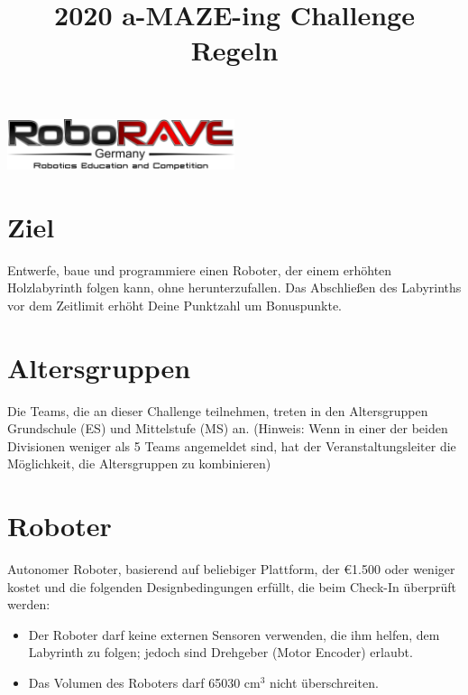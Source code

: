 \documentclass[a4paper,12pt]{article}
\title{2020 a-MAZE-ing Challenge Regeln}
\makeatletter
\let\inserttitle\@title
\makeatother
\begin{document}
\begin{center}
	\includegraphics[width=0.5\textwidth]{logo.png}

	\huge                      %
	\bfseries                   %
	\inserttitle
\end{center}

\section{Ziel}
Entwerfe, baue und programmiere einen Roboter, der einem erhöhten Holzlabyrinth
folgen kann, ohne herunterzufallen. Das Abschließen des Labyrinths vor dem
Zeitlimit erhöht Deine Punktzahl um Bonuspunkte.

\section{Altersgruppen}
Die Teams, die an dieser Challenge teilnehmen, treten in den Altersgruppen
Grundschule (ES) und Mittelstufe (MS) an. (Hinweis: Wenn in einer der beiden
Divisionen weniger als 5 Teams angemeldet sind, hat der Veranstaltungsleiter
die Möglichkeit, die Altersgruppen zu kombinieren)

\section{Roboter}
Autonomer Roboter, basierend auf beliebiger Plattform, der \euro{1.500}  oder
weniger kostet und die folgenden Designbedingungen erfüllt, die beim Check-In
überprüft werden:
\begin{itemize}
	\item Der Roboter darf keine externen Sensoren verwenden, die ihm
		helfen, dem Labyrinth zu folgen; jedoch sind Drehgeber (Motor
		Encoder) erlaubt.
	\item Das Volumen des Roboters darf 65030 cm$^{3}$ nicht überschreiten.
\end{itemize}
\end{document}
